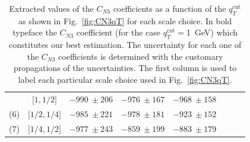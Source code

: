 \documentclass[12pt]{article}
\DeclareRobustCommand{\qtcut}{\ensuremath{q_T^\mathrm{cut}}}
\begin{document}
\begin{table}
\begin{tabular}{ |c|c||c|c|c|c|c|c| }
& $\big[1,1/2 \big]$

& $ -990~\pm 206$ %

& $ -976~\pm 167$%

& $ -968~\pm 158$%

 \\
 
\multirow{1}{*}{(6)} 

& $ \big[1/2,1/4 \big]$

& $ -985~\pm 221$ %

& $ -978~\pm 181$%

& $-923~\pm 152$%

\\

\multirow{1}{*}{(7)} 

& $\big[1/4,1/2 \big]$

& $ -977~\pm 243$ %

& $ -859~\pm 199$%

& $ -883~\pm 179$%
\\

\hline

\end{tabular}

\caption{\label{Table:CN3values}
{Extracted values of the $C_{N3}$ coefficients as a function of the $\qtcut$ as shown in Fig.~\ref{fig:CN3qT} for each scale choice. In bold typeface the $C_{N3}$ coefficient (for the case $\qtcut=$1~GeV) which constitutes our best estimation. The uncertainty for each one of the $C_{N3}$ coefficients is determined with the customary propagations of the uncertainties. The first column is used to label each particular scale choice used in Fig.~\ref{fig:CN3qT}.
}
}
\renewcommand{\arraystretch}{1}

\end{table}
\end{document}
